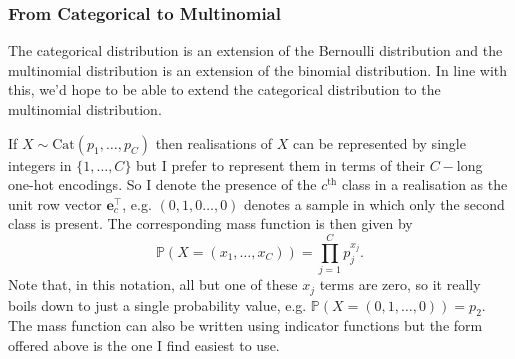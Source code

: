 \documentclass[11pt]{article}
\begin{document}
\begin{appendices}
\subsubsection{From Categorical to Multinomial}
The categorical distribution is an extension of the Bernoulli distribution and the multinomial distribution is an extension of the binomial distribution. In line with this, we'd hope to be able to extend the categorical distribution to the multinomial distribution.

If $X\sim\text{Cat}(p_1,\dots,p_C)$ then realisations of $X$ can be represented by single integers in $\{1,\dots,C\}$ but I prefer to represent them in terms of their $C-$long one-hot encodings. So I denote the presence of the $c^{\text{th}}$ class in a realisation as the unit row vector $\mathbf{e}_c^\top $, e.g. $(0,1,0\dots,0)$ denotes a sample in which only the second class is present. The corresponding mass function is then given by
$$
\mathbb{P}(X=(x_1,\dots,x_C))
=
\prod_{j=1}^Cp_j^{x_j}.
$$
Note that, in this notation, all but one of these $x_j$ terms are zero, so it really boils down to just a single probability value, e.g. $\mathbb{P}(X=(0,1,\dots,0))=p_2$. The mass function can also be written using indicator functions but the form offered above is the one I find easiest to use.


\end{appendices}
\end{document}
